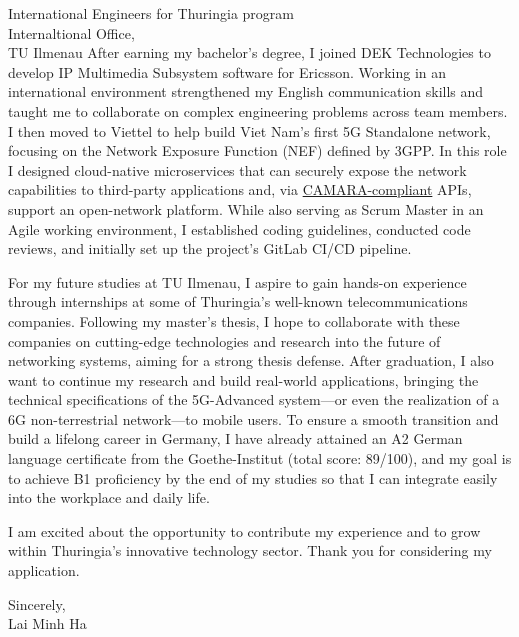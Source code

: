 \documentclass[a4paper,11pt]{letter}
\begin{document}
\begin{letter}{
    International Engineers for Thuringia program
    \\ Internaltional Office,
    \\ TU Ilmenau
}
After earning my bachelor's degree, I joined DEK Technologies to develop IP Multimedia Subsystem software for Ericsson. Working in an international environment strengthened my English communication skills and taught me to collaborate on complex engineering problems across team members. I then moved to Viettel to help build Viet Nam's first 5G Standalone network, focusing on the Network Exposure Function (NEF) defined by 3GPP. In this role I designed cloud-native microservices that can securely expose the network capabilities to third-party applications and, via \href{https://camaraproject.org/}{CAMARA-compliant} APIs, support an open-network platform. While also serving as Scrum Master in an Agile working environment, I established coding guidelines, conducted code reviews, and initially set up the project's GitLab CI/CD pipeline.

For my future studies at TU Ilmenau, I aspire to gain hands-on experience through internships at some of Thuringia's well-known telecommunications companies. Following my master's thesis, I hope to collaborate with these companies on cutting-edge technologies and research into the future of networking systems, aiming for a strong thesis defense. After graduation, I also want to continue my research and build real-world applications, bringing the technical specifications of the 5G-Advanced system—or even the realization of a 6G non-terrestrial network—to mobile users. To ensure a smooth transition and build a lifelong career in Germany, I have already attained an A2 German language certificate from the Goethe-Institut (total score: 89/100), and my goal is to achieve B1 proficiency by the end of my studies so that I can integrate easily into the workplace and daily life.

I am excited about the opportunity to contribute my experience and to grow within Thuringia's innovative technology sector. Thank you for considering my application.
\begin{flushright}
    Sincerely,
    \\Lai Minh Ha
\end{flushright}

\end{letter}
\end{document}
